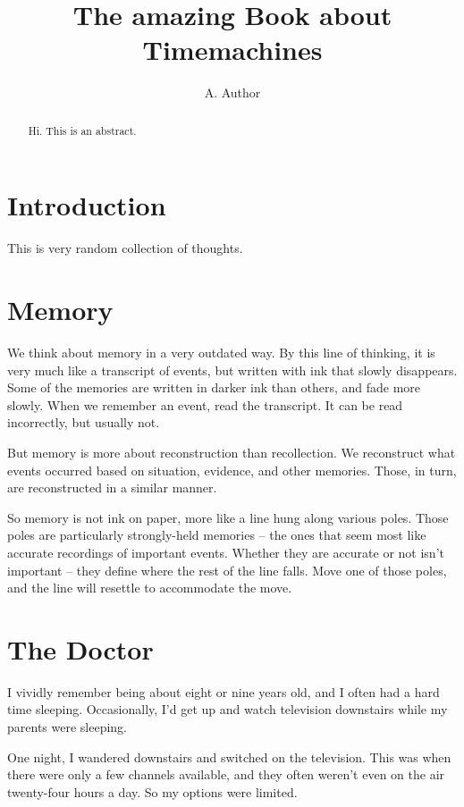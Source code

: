 \documentclass[
a4paper, %
11pt, %
onecolumn, %
openany, %
]{memoir}
\author{A. Author}
\title{The amazing Book about Timemachines}
\begin{document}
\frontmatter

\maketitle

\begin{abstract}
Hi. This is an abstract.
\end{abstract}
\clearpage

\chapter{Introduction}

This is very random collection of thoughts.

\chapter{Memory}

We think about memory in a very outdated way. By this line of thinking, it is very much like a transcript of events, but written with ink that slowly disappears. Some of the memories are written in darker ink than others, and fade more slowly. When we remember an event, read the transcript. It can be read incorrectly, but usually not.

But memory is more about reconstruction than recollection. We reconstruct what events occurred based on situation, evidence, and other memories. Those, in turn, are reconstructed in a similar manner.

So memory is not ink on paper, more like a line hung along various poles. Those poles are particularly strongly-held memories -- the ones that seem most like accurate recordings of important events. Whether they are accurate or not isn't important -- they define where the rest of the line falls. Move one of those poles, and the line will resettle to accommodate the move.

\chapter{The Doctor}

I vividly remember being about eight or nine years old, and I often had a hard time sleeping. Occasionally, I'd get up and watch television downstairs while my parents were sleeping.

One night, I wandered downstairs and switched on the television. This was when there were only a few channels available, and they often weren't even on the air twenty-four hours a day. So my options were limited.
\end{document}
